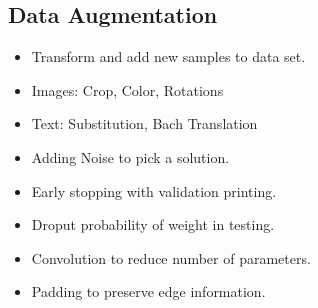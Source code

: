 \documentclass[a4paper,7pt]{extarticle}
\theoremstyle{definition}
\begin{document}
\begin{multicols*}{2}

\subsection{Data Augmentation}

\begin{itemize}
\item Transform and add new samples to data set.
\item Images: Crop, Color, Rotations
\item Text: Substitution, Bach Translation
\item Adding Noise to pick a solution.
\item Early stopping with validation printing.
\item Droput probability of weight in testing.
\item Convolution to reduce number of parameters.
\item Padding to preserve edge information.
\end{itemize}


\end{multicols*}
\end{document}
